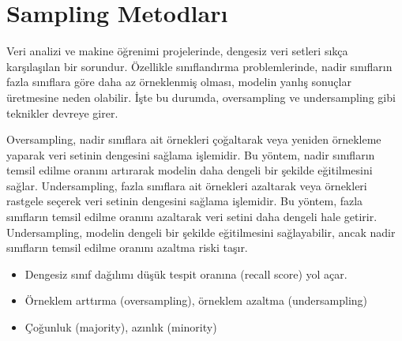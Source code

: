 \section{Sampling Metodları}
Veri analizi ve makine öğrenimi projelerinde, dengesiz veri setleri sıkça karşılaşılan bir sorundur. Özellikle sınıflandırma problemlerinde, nadir sınıfların fazla sınıflara göre daha az örneklenmiş olması, modelin yanlış sonuçlar üretmesine neden olabilir. İşte bu durumda, oversampling ve undersampling gibi teknikler devreye girer.

Oversampling, nadir sınıflara ait örnekleri çoğaltarak veya yeniden örnekleme yaparak veri setinin dengesini sağlama işlemidir. Bu yöntem, nadir sınıfların temsil edilme oranını artırarak modelin daha dengeli bir şekilde eğitilmesini sağlar. Undersampling, fazla sınıflara ait örnekleri azaltarak veya örnekleri rastgele seçerek veri setinin dengesini sağlama işlemidir. Bu yöntem, fazla sınıfların temsil edilme oranını azaltarak veri setini daha dengeli hale getirir. Undersampling, modelin dengeli bir şekilde eğitilmesini sağlayabilir, ancak nadir sınıfların temsil edilme oranını azaltma riski taşır.

\begin{itemize}
    \item Dengesiz sınıf dağılımı düşük tespit oranına (recall score) yol açar.
    \item Örneklem arttırma (oversampling), örneklem azaltma (undersampling)
    \item Çoğunluk (majority), azınlık (minority)
\end{itemize}

